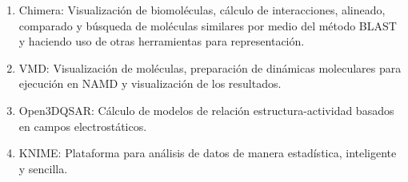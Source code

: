 \documentclass[10pt,letterpaper]{article}
\begin{document}
\begin{enumerate}
\begin{enumerate}
	\item Chimera: Visualizaci\'on de biomol\'eculas, c\'alculo de interacciones, alineado, comparado y b\'usqueda de mol\'eculas similares por medio del m\'etodo BLAST y haciendo uso de otras herramientas para representaci\'on.
	\item VMD: Visualizaci\'on de mol\'eculas, preparaci\'on de din\'amicas moleculares para ejecuci\'on en NAMD y visualizaci\'on de los resultados.
	\item Open3DQSAR: C\'alculo de modelos de relaci\'on estructura-actividad basados en campos electrost\'aticos.
	\item KNIME: Plataforma para an\'alisis de datos de manera estad\'istica, inteligente y sencilla.
	\end{enumerate}
\end{enumerate}
\end{document}
